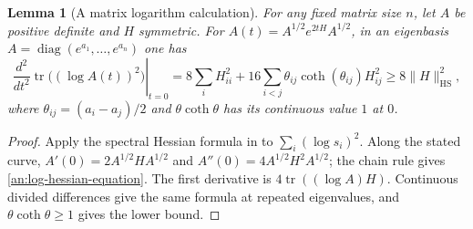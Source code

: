 \documentclass[11pt]{amsart}
\newtheorem{lemma}[theorem]{Lemma}
\theoremstyle{definition}
\theoremstyle{remark}
\numberwithin{equation}{section}
\begin{document}
\begin{lemma}[A matrix logarithm calculation]\label{an:log-hessian}
For any fixed matrix size $n$, let $A$ be positive definite and $H$ symmetric. For $A(t)=A^{1/2}e^{2tH}A^{1/2}$, in an eigenbasis $A=\operatorname{diag}(e^{a_1},\ldots,e^{a_n})$ one has
\begin{equation}\label{an:log-hessian-equation}
\left.\frac{d^2}{dt^2}\operatorname{tr}\bigl((\log A(t))^2\bigr)\right|_{t=0}=8\sum_iH_{ii}^2+16\sum_{i<j}\theta_{ij}\coth(\theta_{ij})H_{ij}^2\ge8\|H\|_{\mathrm{HS}}^2,
\end{equation}
where $\theta_{ij}=(a_i-a_j)/2$ and $\theta\coth\theta$ has its continuous value $1$ at $0$.
\end{lemma}
\begin{proof}
Apply the spectral Hessian formula in \cite[Theorem 3.3]{LewisSendov} to $\sum_i(\log s_i)^2$. Along the stated curve, $A'(0)=2A^{1/2}HA^{1/2}$ and $A''(0)=4A^{1/2}H^2A^{1/2}$; the chain rule gives \eqref{an:log-hessian-equation}. The first derivative is $4\operatorname{tr}((\log A)H)$. Continuous divided differences give the same formula at repeated eigenvalues, and $\theta\coth\theta\ge1$ gives the lower bound.
\end{proof}
\end{document}
